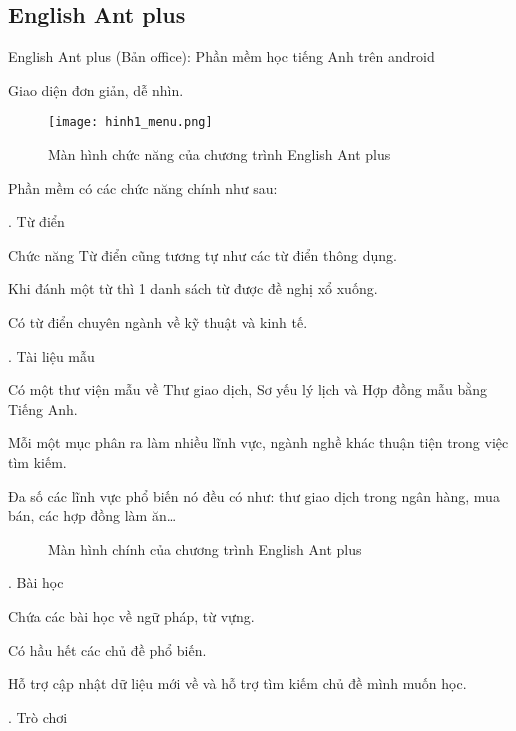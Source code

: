 \subsection{English Ant plus}

English Ant plus (Bản office): Phần mềm học tiếng Anh trên android

Giao diện đơn giản, dễ nhìn.

\begin{figure}[!htb] 
\centering
\texttt{[image: hinh1\_menu.png]}
\caption{Màn hình chức năng của chương trình English Ant plus}
\end{figure}

Phần mềm có các chức năng chính như sau:

. Từ điển

Chức năng Từ điển cũng tương tự như các từ điển thông dụng.


Khi đánh một từ thì 1 danh sách từ được đề nghị xổ xuống.

Có từ điển chuyên ngành về kỹ thuật và kinh tế.

. Tài liệu mẫu

Có một thư viện mẫu về Thư giao dịch, Sơ yếu lý lịch và Hợp đồng mẫu bằng Tiếng Anh.

Mỗi một mục phân ra làm nhiều lĩnh vực, ngành nghề khác thuận tiện trong việc tìm kiếm.

Đa số các lĩnh vực phổ biến nó đều có như: thư giao dịch trong ngân hàng, mua bán, các hợp đồng làm ăn…

\begin{figure}[!h] 
\centering
{}
\caption{Màn hình chính của chương trình English Ant plus}
\end{figure}

. Bài học

Chứa các bài học về ngữ pháp, từ vựng.

Có hầu hết các chủ đề phổ biến.

Hỗ trợ cập nhật dữ liệu mới về và hỗ trợ tìm kiếm chủ đề mình muốn học.

. Trò chơi

